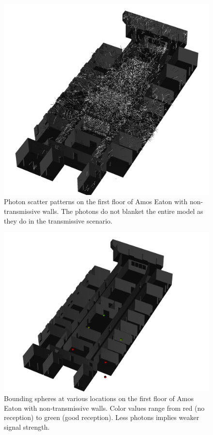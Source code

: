\documentclass[%
        final,
        notitlepage,
        narroweqnarray,
        inline,
        twoside,
        ]{ieee}
\begin{document}
\newpage

\begin{figure}
\begin{center}
\includegraphics[width=120mm]{no_trans_photons.png}
\caption{Photon scatter patterns on the first floor of Amos Eaton with
non-transmissive walls. The photons do not blanket the entire model as they do
in the transmissive scenario.}
\label{no_trans_photons}
\end{center}
\end{figure}

\begin{figure}
\begin{center}
\includegraphics[width=120mm]{no_trans_sphere.png}
\caption{Bounding spheres at various locations on the first floor of Amos Eaton
with non-transmissive walls.  Color values range from red (no reception) to green
(good reception).  Less photons implies weaker signal strength.}
\label{no_trans_sphere}
\end{center}
\end{figure}
\end{document}
